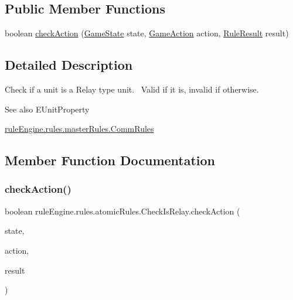 \subsection*{Public Member Functions}
\begin{DoxyCompactItemize}
\item 
boolean \mbox{\hyperlink{classrule_engine_1_1rules_1_1atomic_rules_1_1_check_is_relay_a32d1e800df813f84e497548baff92cd1}{check\+Action}} (\mbox{\hyperlink{classgame_1_1game_state_1_1_game_state}{Game\+State}} state, \mbox{\hyperlink{classrule_engine_1_1_game_action}{Game\+Action}} action, \mbox{\hyperlink{classrule_engine_1_1_rule_result}{Rule\+Result}} result)
\end{DoxyCompactItemize}


\subsection{Detailed Description}
Check if a unit is a Relay type unit.~\newline
 Valid if it is, invalid if otherwise.

\begin{DoxySeeAlso}{See also}
E\+Unit\+Property 

\mbox{\hyperlink{classrule_engine_1_1rules_1_1master_rules_1_1_comm_rules}{rule\+Engine.\+rules.\+master\+Rules.\+Comm\+Rules}} 
\end{DoxySeeAlso}


\subsection{Member Function Documentation}
\mbox{\label{classrule_engine_1_1rules_1_1atomic_rules_1_1_check_is_relay_a32d1e800df813f84e497548baff92cd1}} 
\subsubsection{\texorpdfstring{check\+Action()}{checkAction()}}
{\footnotesize\ttfamily boolean rule\+Engine.\+rules.\+atomic\+Rules.\+Check\+Is\+Relay.\+check\+Action (\begin{DoxyParamCaption}\item[{\mbox{\hyperlink{classgame_1_1game_state_1_1_game_state}{Game\+State}}}]{state,  }\item[{\mbox{\hyperlink{classrule_engine_1_1_game_action}{Game\+Action}}}]{action,  }\item[{\mbox{\hyperlink{classrule_engine_1_1_rule_result}{Rule\+Result}}}]{result }\end{DoxyParamCaption})\hspace{0.3cm}{\ttfamily [inline]}}



